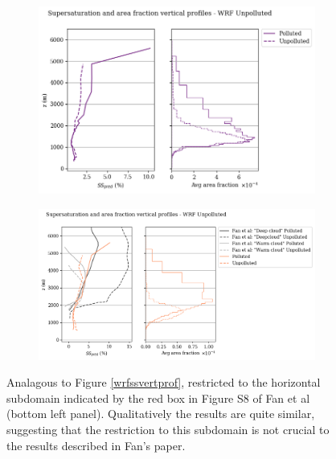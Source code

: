 \documentclass{article}
\begin{document}
\begin{figure}[ht]
	\centering
	\begin{subfigure}{0.7\textwidth}
		\includegraphics[width=\textwidth]{wrf/ss_pred_vs_z_allpts_figure.png}
		\caption{}
		\label{wrfsubdomssvertprofallpts}
	\end{subfigure}
	\begin{subfigure}{0.7\textwidth}
		\includegraphics[width=\textwidth]{wrf/ss_pred_vs_z_up10perc_figure.png}
		\caption{}
		\label{wrfsubdomssvertprofup50perc}
	\end{subfigure}
	\caption{Analagous to Figure \ref{wrfssvertprof}, restricted to the horizontal subdomain indicated by the red box in Figure S8 of Fan et al (bottom left panel). Qualitatively the results are quite similar, suggesting that the restriction to this subdomain is not crucial to the results described in Fan's paper.}
	\label{wrfsubdomssvertprof}
\end{figure}
\end{document}
